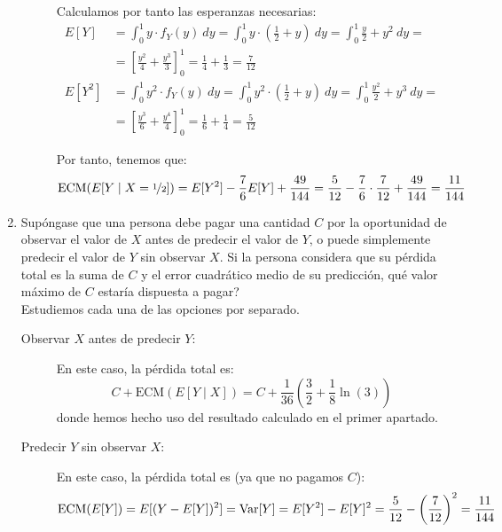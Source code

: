 \begin{ejercicio}
\begin{enumerate}
\begin{description}
            Calculamos por tanto las esperanzas necesarias:
            \begin{align*}
                E[Y] &= \int_{0}^{1} y\cdot f_Y(y) \ dy = \int_{0}^{1} y\cdot \left(\frac{1}{2}+y\right) \ dy
                = \int_{0}^{1} \frac{y}{2}+y^2 \ dy
                =\\&= \left[\frac{y^2}{4}+\frac{y^3}{3}\right]_{0}^{1}
                = \frac{1}{4}+\frac{1}{3} = \frac{7}{12}\\
                E[Y^2] &= \int_{0}^{1} y^2\cdot f_Y(y) \ dy = \int_{0}^{1} y^2\cdot \left(\frac{1}{2}+y\right) \ dy
                = \int_{0}^{1} \frac{y^2}{2}+y^3 \ dy
                =\\&= \left[\frac{y^3}{6}+\frac{y^4}{4}\right]_{0}^{1}
                = \frac{1}{6}+\frac{1}{4} = \frac{5}{12}
            \end{align*}

            Por tanto, tenemos que:
            \begin{align*}
                \text{ECM}(E[Y\mid X = \nicefrac{1}{2}]) &= E[Y^2]-\dfrac{7}{6}E[Y]+\dfrac{49}{144}
                = \frac{5}{12}-\dfrac{7}{6}\cdot \frac{7}{12}+\dfrac{49}{144}
                = \frac{11}{144}
            \end{align*}
        \end{description}

        \item Supóngase que una persona debe pagar una cantidad $C$ por la oportunidad de observar el valor de $X$ antes de predecir el valor de $Y$, o puede simplemente predecir el valor de $Y$ sin observar $X$. Si la persona considera que su pérdida total es la suma de $C$ y el error cuadrático medio de su predicción, qué valor máximo de $C$ estaría dispuesta a pagar?\\
        
        Estudiemos cada una de las opciones por separado.
        \begin{description}
            \item[Observar $X$ antes de predecir $Y$:] En este caso, la pérdida total es:
            \begin{equation*}
                C+\text{ECM}(E[Y\mid X]) = C + \dfrac{1}{36}\left(\dfrac{3}{2} + \dfrac{1}{8}\ln(3)\right)
            \end{equation*}
            donde hemos hecho uso del resultado calculado en el primer apartado.

            \item[Predecir $Y$ sin observar $X$:] En este caso, la pérdida total es (ya que no pagamos $C$):
            \begin{equation*}
                \text{ECM}(E[Y]) = E[(Y-E[Y])^2] = \operatorname{Var}[Y]
                = E[Y^2]-E[Y]^2 = \dfrac{5}{12}-\left(\dfrac{7}{12}\right)^2
                = \dfrac{11}{144}
            \end{equation*}            
        \end{description}


\end{enumerate}
\end{ejercicio}
